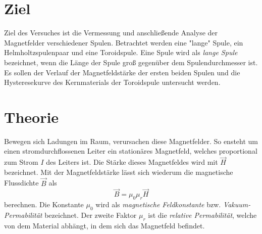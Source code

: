 \section{Ziel}
\label{sec:Ziel}
Ziel des Versuches ist die Vermessung und anschließende Analyse der Magnetfelder verschiedener Spulen. Betrachtet werden eine "lange" \: Spule, ein Helmholtzspulenpaar und eine 
Toroidspule. Eine Spule wird als \textit{lange Spule} bezeichnet, wenn die Länge der Spule groß gegenüber dem Spulendurchmesser ist.
Es sollen der Verlauf der Magnetfeldstärke der ersten beiden Spulen und die Hysteresekurve des Kernmaterials der Toroidspule untersucht werden.

\section{Theorie}
\label{sec:Theorie}
Bewegen sich Ladungen im Raum, verursachen diese Magnetfelder. So ensteht um einen stromdurchflossenen Leiter ein stationäres Magnetfeld, welches proportional zum Strom 
$I$ des Leiters ist. Die Stärke dieses Magnetfeldes wird mit $\vec{H}$ bezeichnet. Mit der Magnetfeldstärke lässt sich wiederum die magnetische Flussdichte $\vec{B}$ als 
\begin{equation}
    \label{eqn:Flussdichte}
    \vec{B} = \mu_0 \mu_r \vec{H}
\end{equation} 
berechnen. Die Konstante $\mu_0$ wird als \textit{magnetische Feldkonstante} bzw. \textit{Vakuum-Permabilität} bezeichnet. Der zweite Faktor $\mu_r$ ist die 
\textit{relative Permabilität}, welche von dem Material abhängt, in dem sich das Magnetfeld befindet. 


